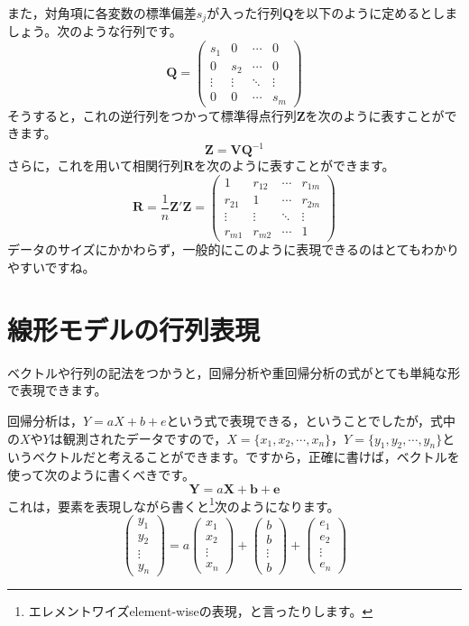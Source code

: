 \documentclass{ltjsbook}
\begin{document}
また，対角項に各変数の標準偏差$s_j$が入った行列$\bm{Q}$を以下のように定めるとしましょう。次のような行列です。
\[ \bm{Q} = \begin{pmatrix} s_1 & 0 & \cdots & 0 \\
						  0 & s_2 & \cdots & 0 \\
						  \vdots & \vdots & \ddots & \vdots   \\
						  0 & 0 & \cdots & s_m \end{pmatrix} \]
そうすると，これの逆行列をつかって標準得点行列$\bm{Z}$を次のように表すことができます。
\[ \bm{Z} = \bm{V} \bm{Q}^{-1} \]
さらに，これを用いて相関行列$\bm{R}$を次のように表すことができます。
\[ \bm{R} = \frac{1}{n}\bm{Z}' \bm{Z} = \begin{pmatrix} 1 & r_{12} & \cdots & r_{1m} \\
												 r_{21} & 1 & \cdots & r_{2m} \\
												 \vdots & \vdots & \ddots & \vdots \\
												 r_{m1} & r_{m2} & \cdots & 1 \end{pmatrix} \]
データのサイズにかかわらず，一般的にこのように表現できるのはとてもわかりやすいですね。

\section{線形モデルの行列表現}
ベクトルや行列の記法をつかうと，回帰分析や重回帰分析の式がとても単純な形で表現できます。

回帰分析は，$Y=aX+b+e$という式で表現できる，ということでしたが，式中の$X$や$Y$は観測されたデータですので，$X=\{x_1,x_2,\cdots,x_n\}$，$Y=\{y_1,y_2,\cdots,y_n\}$というベクトルだと考えることができます。ですから，正確に書けば，ベクトルを使って次のように書くべきです。
\[ \bm{Y} = a\bm{X} + \bm{b} + \bm{e}\]
これは，要素を表現しながら書くと\footnote{エレメントワイズelement-wiseの表現，と言ったりします。}次のようになります。
\[
\begin{pmatrix}
y_1\\
y_2\\
\vdots\\
y_n
\end{pmatrix}
=a
\begin{pmatrix}
x_1\\
x_2\\
\vdots\\
x_n
\end{pmatrix}
+
\begin{pmatrix}
b\\
b\\
\vdots\\
b
\end{pmatrix}
+
\begin{pmatrix}
e_1\\
e_2\\
\vdots\\
e_n
\end{pmatrix}
\]
\end{document}
